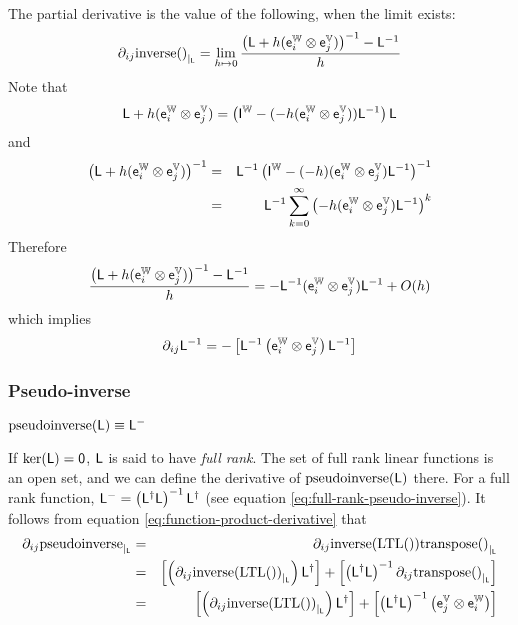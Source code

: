 The partial derivative is the value of the following, when the limit exists:
\begin{displaymath}
{\partial}_{ij}{\mathrm{inverse}()}_{\mid_{\mathsf{L}}}
 =
\lim_{ h \mapsto 0}
\frac{ \left( \mathsf{L} + h (\mathsf{e}_i^{\mathbb{W}} \otimes \mathsf{e}_j^{\mathbb{V}}) \right)^{-1} - \mathsf{L}^{-1} }{h}
\end{displaymath}
Note that
\begin{displaymath}
\mathsf{L} + h (\mathsf{e}_i^{\mathbb{W}} \otimes \mathsf{e}_j^{\mathbb{V}})
 =
\left( \mathsf{I}^{\mathbb{W}} - ( -h ( \mathsf{e}_i^{\mathbb{W}} \otimes \mathsf{e}_j^{\mathbb{V}} )) \mathsf{L}^{-1} \right) \mathsf{L}
\end{displaymath}
and
\begin{eqnarray*}
\left( \mathsf{L} + h (\mathsf{e}_i^{\mathbb{W}} \otimes \mathsf{e}_j^{\mathbb{V}}) \right)^{-1}
& = &
\mathsf{L}^{-1} \left( \mathsf{I}^{\mathbb{W}} - ( -h )( \mathsf{e}_i^{\mathbb{W}} \otimes \mathsf{e}_j^{\mathbb{V}} ) \mathsf{L}^{-1} \right)^{-1}
\\
& = &
\mathsf{L}^{-1} \sum_{k=0}^{\infty} \left( -h ( \mathsf{e}_i^{\mathbb{W}} \otimes \mathsf{e}_j^{\mathbb{V}} ) \mathsf{L}^{-1} \right)^{k}
\nonumber
\end{eqnarray*}
Therefore
\begin{displaymath}
\frac{ \left( \mathsf{L} + h (\mathsf{e}_i^{\mathbb{W}} \otimes \mathsf{e}_j^{\mathbb{V}}) \right)^{-1} - \mathsf{L}^{-1} }{h}
 =
- \mathsf{L}^{-1} ( \mathsf{e}_i^{\mathbb{W}} \otimes \mathsf{e}_j^{\mathbb{V}} )  \mathsf{L}^{-1} + O(h)
\end{displaymath}
which implies
\begin{equation}
{\partial}_{ij}{\mathsf{L}^{-1}}
 =
- \left[
\mathsf{L}^{-1}
\left( \mathsf{e}_i^{\mathbb{W}} \otimes \mathsf{e}_j^{\mathbb{V}} \right)
\mathsf{L}^{-1}
\right]
\end{equation}


\subsubsection{Pseudo-inverse}
\label{sec:Pseudo-inverse}

$\mathrm{pseudoinverse}(\mathsf{L}) \equiv \mathsf{L}^{-}$

If $\mathrm{ker}(\mathsf{L}) = {\mathsf 0}$, $\mathsf{L}$ is said to have {\it full rank}.
The set of full rank linear functions is an open set,
and we can define the derivative of $\mathrm{pseudoinverse}(\mathsf{L})$ there.
For a full rank function,
$\mathsf{L}^{-} = \left( \mathsf{L}^{\dagger} \mathsf{L} \right)^{-1} \mathsf{L}^{\dagger}$
(see equation \ref{eq:full-rank-pseudo-inverse}).
It follows from equation \ref{eq:function-product-derivative} that
\begin{eqnarray}
{\partial}_{ij}{\mathrm{pseudoinverse}}_{\mid_{\mathsf{L}}}
& = &
{\partial}_{ij}{\mathrm{inverse}(\mathrm{LTL}())\mathrm{transpose}()}_{\mid_{\mathsf{L}}}
\\
& = &
\left[
\left( {\partial}_{ij}{\mathrm{inverse}(\mathrm{LTL}())}_{\mid_{\mathsf{L}}} \right)
\mathsf{L}^{\dagger}
\right]
+
\left[
\left( \mathsf{L}^{\dagger} \mathsf{L} \right)^{-1}
{\partial}_{ij}{\mathrm{transpose}()}_{\mid_{\mathsf{L}}}
\right]
\nonumber
\\
& = &
\left[
\left( {\partial}_{ij}{\mathrm{inverse}(\mathrm{LTL}())}_{\mid_{\mathsf{L}}} \right)
\mathsf{L}^{\dagger}
\right]
+
\left[
\left( \mathsf{L}^{\dagger} \mathsf{L} \right)^{-1}
\left( \mathsf{e}_j^{\mathbb{V}} \otimes \mathsf{e}_i^{\mathbb{W}} \right)
\right]
\nonumber
\end{eqnarray}

